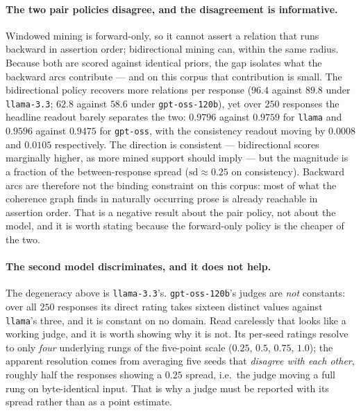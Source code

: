 \paragraph{The two pair policies disagree, and the disagreement is informative.}
Windowed mining is forward-only, so it cannot assert a relation that runs backward in assertion order;
bidirectional mining can, within the same radius. Because both are scored against identical priors, the
gap isolates what the backward arcs contribute --- and on this corpus that contribution is small. The
bidirectional policy recovers more relations per response ($96.4$ against $89.8$ under
\texttt{llama-3.3}; $62.8$ against $58.6$ under \texttt{gpt-oss-120b}), yet over $250$ responses the
headline readout barely separates the two: $0.9796$ against $0.9759$ for \texttt{llama} and $0.9596$
against $0.9475$ for \texttt{gpt-oss}, with the consistency readout moving by $0.0008$ and $0.0105$
respectively. The direction is consistent --- bidirectional scores marginally higher, as more mined
support should imply --- but the magnitude is a fraction of the between-response spread ($\mathrm{sd}
\approx 0.25$ on consistency). Backward arcs are therefore not the
binding constraint on this corpus: most of what the coherence graph finds in naturally occurring prose
is already reachable in assertion order. That is a negative result about the pair policy, not about the
model, and it is worth stating because the forward-only policy is the cheaper of the two.

\paragraph{The second model discriminates, and it does not help.} The degeneracy above is
\texttt{llama-3.3}'s. \texttt{gpt-oss-120b}'s judges are \emph{not} constants: over all $250$ responses its
direct rating takes sixteen distinct values against \texttt{llama}'s three, and it is constant on no
domain. Read
carelessly that looks like a working judge, and it is worth showing why it is not. Its per-seed ratings resolve to only
\emph{four} underlying rungs of the five-point scale ($0.25$, $0.5$, $0.75$, $1.0$); the apparent
resolution comes from averaging five seeds that \emph{disagree with each other}, roughly half the
responses showing a $0.25$ spread, i.e.\ the judge moving a full rung on byte-identical input. That is
why a judge must be reported with its spread rather than as a point estimate.

